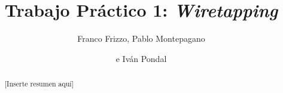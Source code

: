\documentclass[%
    final,
    notitlepage,
    narroweqnarray,
    inline,
    twoside,
]{ieee}
\begin{document}
\title[Trabajo Práctico 1: Wiretapping]{%
       Trabajo Práctico 1: \emph{Wiretapping}}

\author[FRIZZO, MONTEPAGANO, PONDAL]{Franco Frizzo, Pablo Montepagano
\and{}e Iván Pondal}


\maketitle

\begin{abstract}
[Inserte resumen aquí]
\end{abstract}

\begin{keywords}
\end{keywords}








\end{document}
